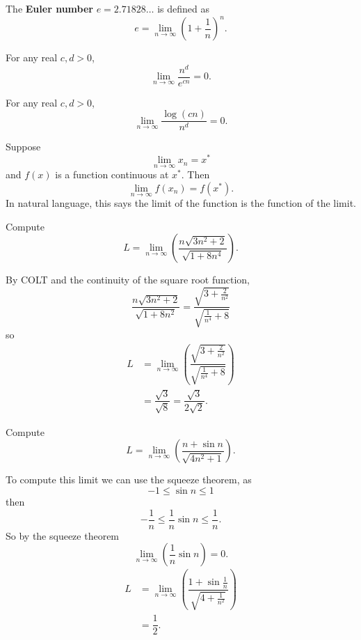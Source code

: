 \begin{definition}
    The \textbf{Euler number} $e=2.71828\ldots$ is defined as \[e=\lim_{n\to\infty}\left(1+\dfrac1n\right)^n.\]
\end{definition}

\begin{theorem}
    For any real $c,d>0$, \[\lim_{n\to\infty}\dfrac{n^d}{e^{cn}}=0.\]
\end{theorem}

\begin{theorem}
    For any real $c,d>0$, \[\lim_{n\to\infty}\dfrac{\log(cn)}{n^d}=0.\]
\end{theorem}

\begin{theorem}
    Suppose \[\lim_{n\to\infty}x_n=x^*\] and $f(x)$ is a function continuous at $x^*$. Then \[\lim_{n\to\infty}f(x_n)=f(x^*).\] In natural language, this says the limit of the function is the function of the limit.
\end{theorem}

\begin{example}
    Compute \[L=\lim_{n\to\infty}\left(\dfrac{n\sqrt{3n^2+2}}{\sqrt{1+8n^4}}\right).\]
    
    By COLT and the continuity of the square root function, \[\dfrac{n\sqrt{3n^2+2}}{\sqrt{1+8n^2}}=\dfrac{\sqrt{3+\frac2{n^2}}}{\sqrt{\frac1{n^4}+8}}\] so
    \begin{align*}
        L&=\lim_{n\to\infty}\left(\dfrac{\sqrt{3+\frac2{n^2}}}{\sqrt{\frac1{n^4}+8}}\right)\\
        &=\dfrac{\sqrt{3}}{\sqrt{8}}=\dfrac{\sqrt3}{2\sqrt 2}.
    \end{align*}
\end{example}

\begin{example}
    Compute \[L=\lim_{n\to\infty}\left(\dfrac{n+\sin{n}}{\sqrt{4n^2+1}}\right).\]
    
    To compute this limit we can use the squeeze theorem, as \[-1\leq\sin{n}\leq1\] then \[-\dfrac1n\leq\dfrac1n\sin{n}\leq\dfrac1n.\] So by the squeeze theorem \[\lim_{n\to\infty}\left(\dfrac1n\sin{n}\right)=0.\]
    \begin{align*}
        L&=\lim_{n\to\infty}\left(\dfrac{1+\sin{\frac1n}}{\sqrt{4+\frac1{n^2}}}\right)\tag{By COLT}\\
        &=\dfrac12.
    \end{align*}
\end{example}

